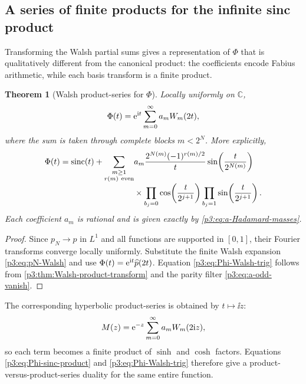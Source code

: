 \documentclass[11pt]{article}
\newtheorem{theorem}{Theorem}[section]
\theoremstyle{definition}
\theoremstyle{remark}
\newcommand{\C}{\mathbb C}
\begin{document}
\subsection{A series of finite products for the infinite sinc product}

Transforming the Walsh partial sums gives a representation of $\Phi$ that is
qualitatively different from the canonical product: the coefficients encode
Fabius arithmetic, while each basis transform is a finite product.

\begin{theorem}[Walsh product-series for $\Phi$]
\label{p3:thm:Phi-Walsh-product-series}
Locally uniformly on $\C$,
\begin{equation}\label{p3:eq:Phi-Walsh-basic}
 \Phi(t)=\mathrm e^{\mathrm i t}\sum_{m=0}^\infty a_mW_m(2t),
\end{equation}
where the sum is taken through complete blocks $m<2^N$.  More explicitly,
\begin{align}
 \Phi(t)=\operatorname{sinc}(t)
 +\sum_{\substack{m\ge1\\r(m)\ \mathrm{even}}}
 &a_m\frac{2^{N(m)}(-1)^{r(m)/2}}{t}
 \sin\!\left(\frac{t}{2^{N(m)}}\right)
 \label{p3:eq:Phi-Walsh-trig}\\[-0.3em]
 &\times
 \prod_{b_j=0}\cos\!\left(\frac{t}{2^{j+1}}\right)
 \prod_{b_j=1}\sin\!\left(\frac{t}{2^{j+1}}\right).
 \nonumber
\end{align}
Each coefficient $a_m$ is rational and is given exactly by
\eqref{p3:eq:a-Hadamard-masses}.
\end{theorem}

\begin{proof}
Since $p_N\to p$ in $L^1$ and all functions are supported in $[0,1]$, their
Fourier transforms converge locally uniformly.  Substitute the finite Walsh
expansion \eqref{p3:eq:pN-Walsh} and use
$\Phi(t)=\mathrm e^{\mathrm i t}\widehat p(2t)$.  Equation
\eqref{p3:eq:Phi-Walsh-trig} follows from
\cref{p3:thm:Walsh-product-transform} and the parity filter
\eqref{p3:eq:a-odd-vanish}.
\end{proof}

The corresponding hyperbolic product-series is obtained by $t\mapsto\ii z$:
\begin{equation}\label{p3:eq:M-Walsh}
 M(z)=\mathrm e^{-z}\sum_{m=0}^\infty a_mW_m(2\mathrm i z),
\end{equation}
so each term becomes a finite product of $\sinh$ and $\cosh$ factors.
Equations \eqref{p3:eq:Phi-sinc-product} and \eqref{p3:eq:Phi-Walsh-trig} therefore
give a product-versus-product-series duality for the same entire function.
\end{document}
